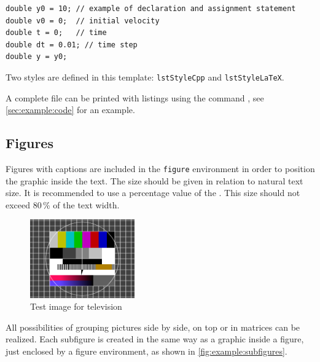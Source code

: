 \begin{lstlisting}
double y0 = 10; // example of declaration and assignment statement
double v0 = 0;  // initial velocity
double t = 0;   // time
double dt = 0.01; // time step
double y = y0;
\end{lstlisting}
%
Two styles are defined in this template: \texttt{lstStyleCpp} and \texttt{lstStyleLaTeX}.

A complete file can be printed with listings using the 
command , see \cref{sec:example:code} for an example.
\subsection{Figures}
\label{sec:example:figures}
%
Figures with captions are included in the \texttt{figure} environment in order to position the graphic inside the text. The size should be given in relation to natural text size. It is recommended to use a percentage value of the . This size should not exceed 80\,\%  of the text width.

\begin{figure}[htb]
  \centering
  \includegraphics[width=0.4\textwidth]{images/testimage.png}
  \caption{Test image for television}
  \label{fig:example:figure}
\end{figure}

All possibilities of grouping pictures side by side, on top or in matrices can be realized. Each subfigure is created in the same way as a graphic inside a figure, just enclosed by a figure environment, as shown in \cref{fig:example:subfigures}.

